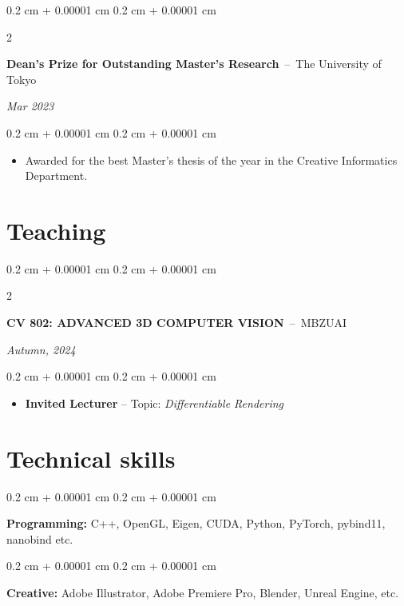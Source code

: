 \documentclass[10pt, letterpaper]{article}
\newenvironment{highlights}{
    \begin{itemize}[
        topsep=0.10 cm,
        parsep=0.10 cm,
        partopsep=0pt,
        itemsep=0pt,
        leftmargin=0.4 cm + 10pt
    ]
}{
    \end{itemize}
} %
\newenvironment{onecolentry}{
    \begin{adjustwidth}{
        0.2 cm + 0.00001 cm
    }{
        0.2 cm + 0.00001 cm
    }
}{
    \end{adjustwidth}
} %
\newenvironment{twocolentry}[2][]{
    \onecolentry
    \def\secondColumn{#2}
    \setcolumnwidth{\fill, 4.5 cm}
    \begin{paracol}{2}
}{
    \switchcolumn \raggedleft \secondColumn
    \end{paracol}
    \endonecolentry
} %
\begin{document}
        \vspace{0.2 cm}
        \begin{twocolentry}{
        \textit{Mar 2023}}
            \textbf{Dean's Prize for Outstanding Master's Research}
            \,--\,
            The University of Tokyo
        \end{twocolentry}
        \vspace{0.10 cm}
        \begin{onecolentry}
            \begin{highlights}
                \item Awarded for the best Master's thesis of the year in the Creative Informatics Department.
            \end{highlights}
        \end{onecolentry}

    \section{Teaching}
        \begin{twocolentry}{
        \textit{Autumn, 2024}}
            \textbf{CV 802: ADVANCED 3D COMPUTER VISION}
            \,--\, MBZUAI
        \end{twocolentry}
        \vspace{0.10 cm}
        \begin{onecolentry}
            \begin{highlights}
                \item \textbf{Invited Lecturer} -- Topic: \textit{Differentiable Rendering}
            \end{highlights}
        \end{onecolentry}

    \section{Technical skills}
        \begin{onecolentry}
            \textbf{Programming:} C++, OpenGL, Eigen, CUDA, Python, PyTorch, pybind11, nanobind etc.
        \end{onecolentry}

        \vspace{0.2 cm}
        \begin{onecolentry}
            \textbf{Creative:} Adobe Illustrator, Adobe Premiere Pro, Blender, Unreal Engine, etc.
        \end{onecolentry}
\end{document}
